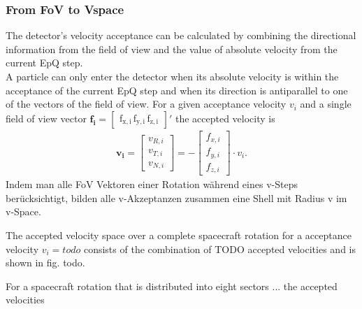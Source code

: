 \subsubsection{From FoV to Vspace}
The detector's velocity acceptance can be calculated by combining the directional information from the field of view and the value of absolute velocity from the current EpQ step. 
\\
A particle can only enter the detector when its absolute velocity is within the acceptance of the current EpQ step and when its direction is antiparallel to one of the vectors of the field of view. For a given acceptance velocity $v_i$ and a single field of view vector $\mathrm{\mathbf{f_i} = \begin{bmatrix}f_{x,i}\,f_{y,i}\,f_{z,i}\end{bmatrix}}'$ the accepted velocity is
\begin{align*}
\mathbf{v_i} = \begin{bmatrix}v_{R,i}\\v_{T,i}\\v_{N,i}\end{bmatrix} = - \begin{bmatrix}f_{x,i}\\f_{y,i}\\f_{z,i}\end{bmatrix} \cdot v_i.
\end{align*}
Indem man alle FoV Vektoren einer Rotation während eines v-Steps berücksichtigt, bilden alle v-Akzeptanzen zusammen eine Shell mit Radius v im v-Space.


The accepted velocity space over a complete spacecraft rotation for a acceptance velocity $v_i = todo$ consists of the combination of TODO accepted velocities and is shown in fig. todo. 


For a spacecraft rotation that is distributed into eight sectors ... the accepted velocities 





